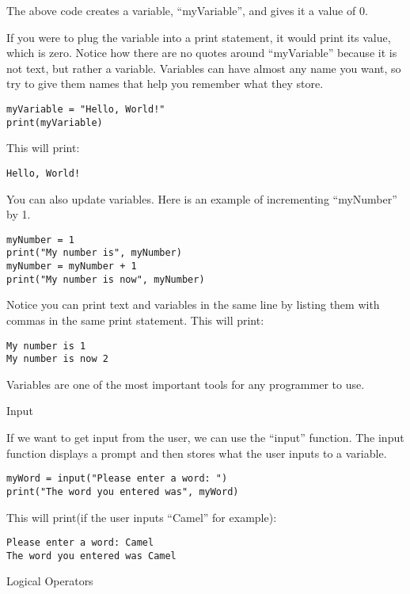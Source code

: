 \documentclass[12pt,oneside]{article}
\newcommand{\q}[1]{``#1''}
\newcommand{\subsectitle}[1]{
  \begin{flushleft}{\large#1}\end{flushleft}
}
\begin{document}
The above code creates a variable, \q{myVariable}, and gives it a value of 0. 

If you were to plug the variable into a print statement, it would print its value, which is zero. Notice how there are no quotes around \q{myVariable} because it is not text, but rather a variable. Variables can have almost any name you want, so try to give them names that help you remember what they store.

\begin{lstlisting}
myVariable = "Hello, World!"
print(myVariable)
\end{lstlisting}

This will print:

\begin{lstlisting}
Hello, World!
\end{lstlisting}

You can also update variables. Here is an example of incrementing \q{myNumber} by 1.

\begin{lstlisting}
myNumber = 1
print("My number is", myNumber)
myNumber = myNumber + 1
print("My number is now", myNumber)
\end{lstlisting}

Notice you can print text and variables in the same line by listing them with commas in the same print statement. This will print:

\begin{lstlisting}
My number is 1
My number is now 2
\end{lstlisting}

Variables are one of the most important tools for any programmer to use.

\subsectitle{Input}

If we want to get input from the user, we can use the \q{input} function. The input function displays a prompt and then stores what the user inputs to a variable.

\begin{lstlisting}
myWord = input("Please enter a word: ")
print("The word you entered was", myWord)
\end{lstlisting}

This will print(if the user inputs \q{Camel} for example): 

\begin{lstlisting}
Please enter a word: Camel
The word you entered was Camel
\end{lstlisting}

\subsectitle{Logical Operators}
\end{document}
